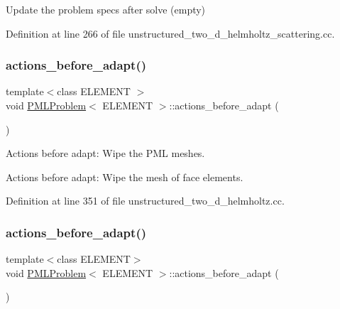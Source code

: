 Update the problem specs after solve (empty) 



Definition at line 266 of file unstructured\+\_\+two\+\_\+d\+\_\+helmholtz\+\_\+scattering.\+cc.

\mbox{\label{classPMLProblem_a310fb36ad1401d9d975957ecee43accc}} 
\subsubsection{\texorpdfstring{actions\+\_\+before\+\_\+adapt()}{actions\_before\_adapt()}\hspace{0.1cm}{\footnotesize\ttfamily [1/2]}}
{\footnotesize\ttfamily template$<$class E\+L\+E\+M\+E\+NT $>$ \\
void \hyperlink{classPMLProblem}{P\+M\+L\+Problem}$<$ E\+L\+E\+M\+E\+NT $>$\+::actions\+\_\+before\+\_\+adapt (\begin{DoxyParamCaption}{ }\end{DoxyParamCaption})}



Actions before adapt\+: Wipe the P\+ML meshes. 

Actions before adapt\+: Wipe the mesh of face elements. 

Definition at line 351 of file unstructured\+\_\+two\+\_\+d\+\_\+helmholtz.\+cc.

\mbox{\label{classPMLProblem_a310fb36ad1401d9d975957ecee43accc}} 
\subsubsection{\texorpdfstring{actions\+\_\+before\+\_\+adapt()}{actions\_before\_adapt()}\hspace{0.1cm}{\footnotesize\ttfamily [2/2]}}
{\footnotesize\ttfamily template$<$class E\+L\+E\+M\+E\+NT$>$ \\
void \hyperlink{classPMLProblem}{P\+M\+L\+Problem}$<$ E\+L\+E\+M\+E\+NT $>$\+::actions\+\_\+before\+\_\+adapt (\begin{DoxyParamCaption}{ }\end{DoxyParamCaption})}



